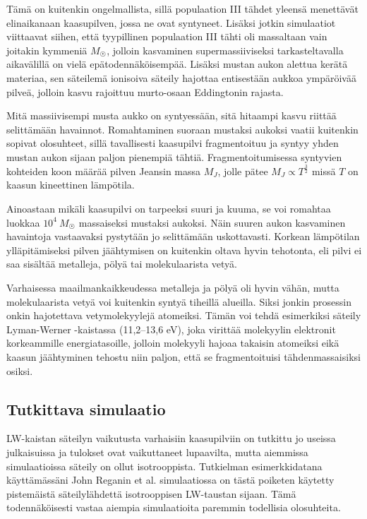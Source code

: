 \documentclass[12pt,a4paper]{article}
\begin{document}
Tämä on kuitenkin ongelmallista, sillä populaation III tähdet yleensä menettävät elinaikanaan kaasupilven, jossa ne ovat syntyneet. Lisäksi jotkin simulaatiot viittaavat siihen, että tyypillinen populaation III tähti oli massaltaan vain joitakin kymmeniä $M_{\astrosun}$, jolloin kasvaminen supermassiiviseksi tarkasteltavalla aikavälillä on vielä epätodennäköisempää. Lisäksi mustan aukon alettua kerätä materiaa, sen säteilemä ionisoiva säteily hajottaa entisestään aukkoa ympäröivää pilveä, jolloin kasvu rajoittuu murto-osaan Eddingtonin rajasta. \cite{whalen, alvarez, volker}

Mitä massiivisempi musta aukko on syntyessään, sitä hitaampi kasvu riittää selittämään havainnot. Romahtaminen suoraan mustaksi aukoksi vaatii kuitenkin sopivat olosuhteet, sillä tavallisesti kaasupilvi fragmentoituu ja syntyy yhden mustan aukon sijaan paljon pienempiä tähtiä. Fragmentoitumisessa syntyvien kohteiden koon määrää pilven Jeansin massa $M_J$, jolle pätee $M_J \propto T^{\frac{3}{2}}$ missä $T$ on kaasun kineettinen lämpötila. \cite{volker, rj, tape}

Ainoastaan mikäli kaasupilvi on tarpeeksi suuri ja kuuma, se voi romahtaa luokkaa $10^4\ M_{\astrosun}$ massaiseksi mustaksi aukoksi. Näin suuren aukon kasvaminen havaintoja vastaavaksi pystytään jo selittämään uskottavasti. Korkean lämpötilan ylläpitämiseksi pilven jäähtymisen on kuitenkin oltava hyvin tehotonta, eli pilvi ei saa sisältää metalleja, pölyä tai molekulaarista vetyä. \cite{volker, rj}

Varhaisessa maailmankaikkeudessa metalleja ja pölyä oli hyvin vähän, mutta molekulaarista vetyä voi kuitenkin syntyä tiheillä alueilla. Siksi jonkin prosessin onkin hajotettava vetymolekyylejä atomeiksi. Tämän voi tehdä esimerkiksi säteily Lyman-Werner -kaistassa (11,2--13,6 eV), joka virittää molekyylin elektronit korkeammille energiatasoille, jolloin molekyyli hajoaa takaisin atomeiksi eikä kaasun jäähtyminen tehostu niin paljon, että se fragmentoituisi tähdenmassaisiksi osiksi. \cite{rj}

\subsection{Tutkittava simulaatio}
LW-kaistan säteilyn vaikutusta varhaisiin kaasupilviin on tutkittu jo useissa julkaisuissa ja tulokset ovat vaikuttaneet lupaavilta, mutta aiemmissa simulaatioissa säteily on ollut isotrooppista. Tutkielman esimerkkidatana käyttämässäni John Reganin et al. simulaatiossa on tästä poiketen käytetty pistemäistä säteilylähdettä isotrooppisen LW-taustan sijaan. Tämä todennäköisesti vastaa aiempia simulaatioita paremmin todellisia olosuhteita. \cite{rj}
\end{document}
